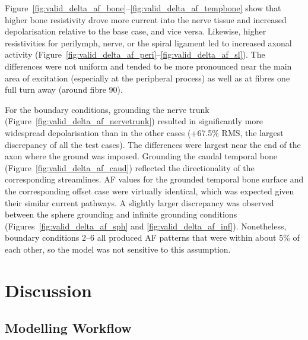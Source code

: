 Figure~\ref{fig:valid_delta_af_bone}--\ref{fig:valid_delta_af_tempbone} show
that higher bone resistivity drove more current into the nerve tissue and
increased depolarisation relative to the base case, and vice versa. Likewise,
higher resistivities for perilymph, nerve, or the spiral ligament led to
increased axonal activity
(Figure~\ref{fig:valid_delta_af_peri}--\ref{fig:valid_delta_af_sl}). The
differences were not uniform and tended to be more pronounced near the main area
of excitation (especially at the peripheral process) as well as at fibres one
full turn away (around fibre 90).

For the boundary conditions, grounding the nerve trunk
(Figure~\ref{fig:valid_delta_af_nervetrunk}) resulted in significantly more
widespread depolarisation than in the other cases (+67.5\% RMS, the largest
discrepancy of all the test cases). The differences were largest near the end of
the axon where the ground was imposed. Grounding the caudal temporal bone
(Figure~\ref{fig:valid_delta_af_caud}) reflected the directionality of the
corresponding streamlines. AF values for the grounded temporal bone surface and
the corresponding offset case were virtually identical, which was expected given
their similar current pathways. A slightly larger discrepancy was observed
between the sphere grounding and infinite grounding conditions
(Figures~\ref{fig:valid_delta_af_sph} and \ref{fig:valid_delta_af_inf}).
Nonetheless, boundary conditions 2--6 all produced AF patterns that were within
about 5\% of each other, so the model was not sensitive to this assumption.

\section{Discussion}
\label{sect:validation_discussion}

\subsection{Modelling Workflow}

